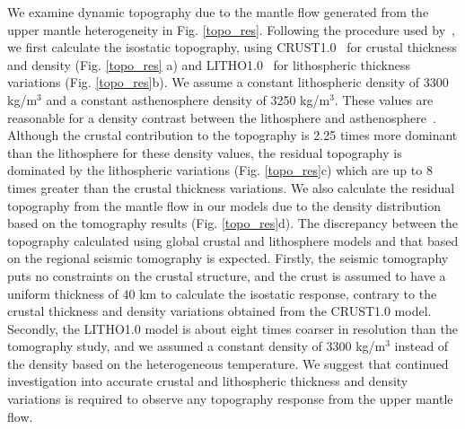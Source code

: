 \documentclass[draft,linenumbers]{agujournal2018}
\begin{document}
    We examine dynamic topography due to the mantle flow generated from the upper mantle heterogeneity in Fig. \ref{topo_res}. Following the procedure used by~\citep{becker2014static}, we first calculate the isostatic topography, using CRUST1.0~\citep{laske2013update} for crustal thickness and density (Fig. \ref{topo_res} a) and LITHO1.0~\citep{pasyanos2014litho1} for lithospheric thickness variations (Fig. \ref{topo_res}b). We assume a constant lithospheric density of 3300 kg/m$^3$ and a constant asthenosphere density of 3250 kg/m$^3$. These values are reasonable for a density contrast between the lithosphere and asthenosphere~\citep[e.g.,][]{bonnardot2008numerical, ito2011probing}. Although the crustal contribution to the topography is 2.25 times more dominant than the lithosphere for these density values, the residual topography is dominated by the lithospheric variations (Fig. \ref{topo_res}c) which are up to 8 times greater than the crustal thickness variations. We also calculate the residual topography from the mantle flow in our models due to the density distribution based on the \citet{Biryol_2016} tomography results (Fig. \ref{topo_res}d). The discrepancy between the topography calculated using global crustal and lithosphere models and that based on the regional seismic tomography is expected. Firstly, the seismic tomography puts no constraints on the crustal structure, and the crust is assumed to have a uniform thickness of 40 km to calculate the isostatic response, contrary to the crustal thickness and density variations obtained from the CRUST1.0 model. Secondly, the LITHO1.0 model is about eight times coarser in resolution than the tomography study, and we assumed a constant density of 3300 kg/m$^3$ instead of the density based on the heterogeneous temperature. We suggest that continued investigation into accurate crustal and lithospheric thickness and density variations is required to observe any topography response from the upper mantle flow.
%
\end{document}
